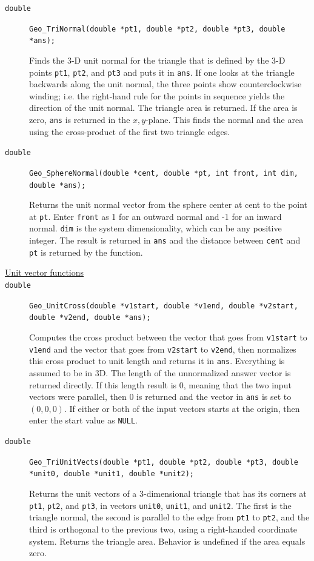 \documentclass[11pt]{article}
\newcommand {\ttt} {\texttt}
\begin{document}
\begin{description}
\item[\ttt{double}]
\ttt{Geo\_TriNormal(double *pt1, double *pt2, double *pt3, double *ans);}

Finds the 3-D unit normal for the triangle that is defined by the 3-D points \ttt{pt1}, \ttt{pt2}, and \ttt{pt3} and puts it in \ttt{ans}. If one looks at the triangle backwards along the unit normal, the three points show counterclockwise winding; i.e. the right-hand rule for the points in sequence yields the direction of the unit normal. The triangle area is returned. If the area is zero, \ttt{ans} is returned in the $x,y$-plane. This finds the normal and the area using the cross-product of the first two triangle edges.

\item[\ttt{double}]
\ttt{Geo\_SphereNormal(double *cent, double *pt, int front, int dim, double *ans);}

Returns the unit normal vector from the sphere center at cent to the point at \ttt{pt}. Enter \ttt{front} as 1 for an outward normal and -1 for an inward normal. \ttt{dim} is the system dimensionality, which can be any positive integer. The result is returned in \ttt{ans} and the distance between \ttt{cent} and \ttt{pt} is returned by the function.

\item[\underline{Unit vector functions}]

\item[\ttt{double}]
\ttt{Geo\_UnitCross(double *v1start, double *v1end, double *v2start, double *v2end, double *ans);}

Computes the cross product between the vector that goes from \ttt{v1start} to \ttt{v1end} and the vector that goes from \ttt{v2start} to \ttt{v2end}, then normalizes this cross product to unit length and returns it in \ttt{ans}. Everything is assumed to be in 3D. The length of the unnormalized answer vector is returned directly. If this length result is 0, meaning that the two input vectors were parallel, then 0 is returned and the vector in \ttt{ans} is set to $(0,0,0)$. If either or both of the input vectors starts at the origin, then enter the start value as \ttt{NULL}.

\item[\ttt{double}]
\ttt{Geo\_TriUnitVects(double *pt1, double *pt2, double *pt3, double *unit0, double *unit1, double *unit2);}

Returns the unit vectors of a 3-dimensional triangle that has its corners at \ttt{pt1}, \ttt{pt2}, and \ttt{pt3}, in vectors \ttt{unit0}, \ttt{unit1}, and \ttt{unit2}. The first is the triangle normal, the second is parallel to the edge from \ttt{pt1} to \ttt{pt2}, and the third is orthogonal to the previous two, using a right-handed coordinate system. Returns the triangle area. Behavior is undefined if the area equals zero.


\end{description}
\end{document}
